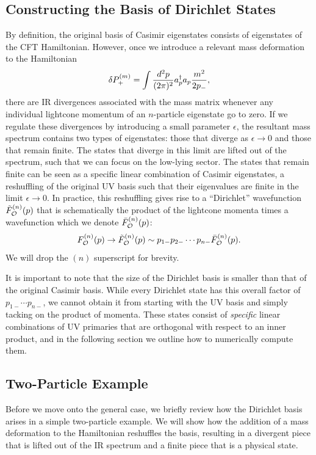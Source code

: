 \begin{subappendices}

\section{Constructing the Basis of Dirichlet States}
\label{sec:ConstructingBasis}

By definition, the original basis of Casimir eigenstates consists of eigenstates 
of the CFT Hamiltonian. However, once we introduce a relevant mass deformation 
to the Hamiltonian 
\begin{equation}
    \delta P_+^{(m)} = \int \frac{d^2 p}{(2\pi)^2} a^\dagger_p a_p \frac{m^2}{2 p_-},
\end{equation} 
there are IR divergences associated with the mass matrix whenever any individual 
lightcone momentum of an $n$-particle eigenstate go to zero. If we regulate 
these divergences by introducing a small parameter $\epsilon$, the resultant 
mass spectrum contains two types of eigenstates: those that diverge as 
$\epsilon \to 0$ and those that remain finite. The states that diverge in this 
limit are lifted out of the spectrum, such that we can focus on the low-lying 
sector. The states that remain finite can be seen as a specific linear 
combination of Casimir eigenstates, a reshuffling of the original UV basis such 
that their eigenvalues are finite in the limit $\epsilon \to 0$. In practice, 
this reshuffling gives rise to a ``Dirichlet'' wavefunction 
$\tilde{F}_{{\cal O}}^{(n)}(p)$ that is schematically the product of the lightcone 
momenta times a wavefunction which we denote $\bar{F}_{{\cal O}}^{(n)}(p)$: 
\begin{equation}
    F_{{\cal O}}^{(n)}(p) \to \tilde{F}_{{\cal O}}^{(n)}(p) \sim p_{1-} p_{2-} \dotsb p_{n-} \bar{F}_{{\cal O}}^{(n)}(p). \label{dirshuffle}
\end{equation} 
We will drop the $(n)$ superscript for brevity. 

It is important to note that the size of the Dirichlet basis is smaller than 
that of the original Casimir basis. While every Dirichlet state has this overall 
factor of $p_{1-} \dotsb p_{n-}$, we cannot obtain it from starting with the UV 
basis and simply tacking on the product of momenta. These states consist of 
\textit{specific} linear combinations of UV primaries that are orthogonal with 
respect to an inner product, and in the following section we outline how to 
numerically compute them.

\subsection{Two-Particle Example} Before we move onto the general case, we 
briefly review how the Dirichlet basis arises in a simple two-particle example. 
We will show how the addition of a mass deformation to the Hamiltonian 
reshuffles the basis, resulting in a divergent piece that is lifted out of the 
IR spectrum and a finite piece that is a physical state.


\end{subappendices}

